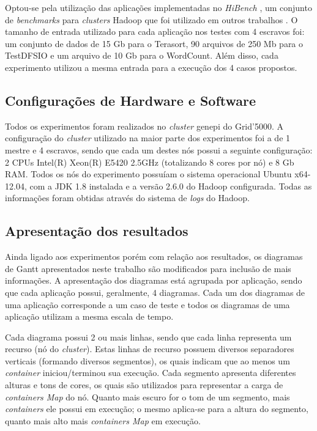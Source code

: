 Optou-se pela utilização das aplicações implementadas no \textit{HiBench} \cite{HiBench}, um conjunto de \textit{benchmarks} para \textit{clusters} Hadoop que foi utilizado em outros trabalhos \cite{HBA, HBB, HBC}. O tamanho de entrada utilizado para cada aplicação nos testes com 4 escravos foi: um conjunto de dados de 15 Gb para o Terasort, 90 arquivos de 250 Mb para o TestDFSIO e um arquivo de 10 Gb para o WordCount. Além disso, cada experimento utilizou a mesma entrada para a execução dos 4 casos propostos.

\subsection{Configurações de Hardware e Software}
Todos os experimentos foram realizados no \textit{cluster} genepi do Grid'5000. A configuração do \textit{cluster} utilizado na maior parte dos experimentos foi a de 1 mestre e 4 escravos, sendo que cada um destes nós possui a seguinte configuração: 2 CPUs Intel(R) Xeon(R) E5420 2.5GHz (totalizando 8 cores por nó) e 8 Gb RAM. Todos os nós do experimento possuíam o sistema operacional Ubuntu x64-12.04, com a JDK 1.8 instalada e a versão 2.6.0 do Hadoop configurada. Todas as informações foram obtidas através do sistema de \textit{logs} do Hadoop.

\subsection{Apresentação dos resultados}
\label{sec:apresentacao}
Ainda ligado aos experimentos porém com relação aos resultados, os diagramas de Gantt apresentados neste trabalho são modificados para inclusão de mais informações. A apresentação dos diagramas está agrupada por aplicação, sendo que cada aplicação possui, geralmente, 4 diagramas. Cada um dos diagramas de uma aplicação corresponde a um caso de teste e todos os diagramas de uma aplicação utilizam a mesma escala de tempo.

Cada diagrama possui 2 ou mais linhas, sendo que cada linha representa  um recurso (nó do \textit{cluster}). Estas linhas de recurso possuem diversos separadores verticais (formando diversos segmentos), os quais indicam que ao menos um \textit{container} iniciou/terminou sua execução. Cada segmento apresenta diferentes alturas e tons de cores, os quais são utilizados para representar a carga de \textit{containers Map} do nó. Quanto mais escuro for o tom de um segmento, mais \textit{containers} ele possui em execução; o mesmo aplica-se para a altura do segmento, quanto mais alto mais \textit{containers Map} em execução.

